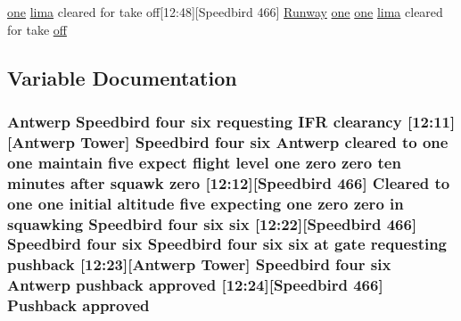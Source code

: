 \begin{DoxyCompactItemize}
\hyperlink{happyDay5ExpectedATC_8txt_a1bdf675837626f29e859d1a241701d26}{one} \hyperlink{happyDay5ExpectedATC_8txt_abc10fad7597c191bcd8586b1cddb7835}{lima} cleared for take off\mbox{[}12\+:48\mbox{]}\mbox{[}Speedbird 466\mbox{]} \hyperlink{classRunway}{Runway} \hyperlink{happyDay5ExpectedATC_8txt_a1bdf675837626f29e859d1a241701d26}{one} \hyperlink{happyDay5ExpectedATC_8txt_a1bdf675837626f29e859d1a241701d26}{one} \hyperlink{happyDay5ExpectedATC_8txt_abc10fad7597c191bcd8586b1cddb7835}{lima} cleared for take \hyperlink{happyDay4ATC_8txt_a29c691e3d615c36339c8fd5f44a0cff1}{off}
\end{DoxyCompactItemize}


\subsection{Variable Documentation}
\subsubsection[{\texorpdfstring{approved}{approved}}]{\setlength{\rightskip}{0pt plus 5cm}Antwerp Speedbird four {\bf six} requesting I\+FR clearancy \mbox{[}12\+:11\mbox{]}\mbox{[}Antwerp {\bf Tower}\mbox{]} Speedbird four {\bf six} Antwerp cleared to {\bf one} {\bf one} maintain five expect flight level {\bf one} {\bf zero} {\bf zero} {\bf ten} minutes after squawk {\bf zero} \mbox{[}12\+:12\mbox{]}\mbox{[}Speedbird 466\mbox{]} Cleared to {\bf one} {\bf one} initial altitude five expecting {\bf one} {\bf zero} {\bf zero} in {\bf squawking} Speedbird four {\bf six} {\bf six} \mbox{[}12\+:22\mbox{]}\mbox{[}Speedbird 466\mbox{]} Speedbird four {\bf six} Speedbird four {\bf six} {\bf six} at gate requesting pushback \mbox{[}12\+:23\mbox{]}\mbox{[}Antwerp {\bf Tower}\mbox{]} Speedbird four {\bf six} Antwerp pushback approved \mbox{[}12\+:24\mbox{]}\mbox{[}Speedbird 466\mbox{]} Pushback approved}\hypertarget{happyDay4ATC_8txt_ac858d170c8c9788ee90f1502f4299d18}{}\label{happyDay4ATC_8txt_ac858d170c8c9788ee90f1502f4299d18}
